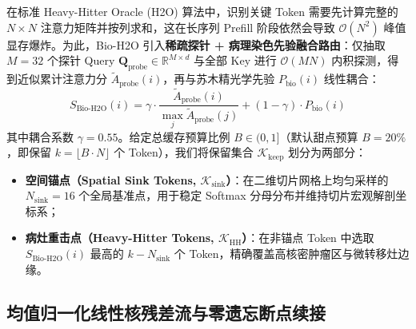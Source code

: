 \documentclass[10pt,twocolumn,a4paper]{ctexart}
\begin{document}
在标准 Heavy-Hitter Oracle (H2O) 算法中，识别关键 Token 需要先计算完整的 $N \times N$ 注意力矩阵并按列求和，这在长序列 Prefill 阶段依然会导致 $\mathcal{O}(N^2)$ 峰值显存爆炸。为此，Bio-H2O 引入\textbf{稀疏探针 + 病理染色先验融合路由}：仅抽取 $M=32$ 个探针 Query $\mathbf{Q}_{\text{probe}} \in \mathbb{R}^{M \times d}$ 与全部 Key 进行 $\mathcal{O}(M N)$ 内积探测，得到近似累计注意力分 $\tilde{A}_{\text{probe}}(i)$，再与苏木精光学先验 $P_{\text{bio}}(i)$ 线性耦合：
\begin{equation}
    S_{\text{Bio-H2O}}(i) = \gamma \cdot \frac{\tilde{A}_{\text{probe}}(i)}{\max_j \tilde{A}_{\text{probe}}(j)} + (1 - \gamma) \cdot P_{\text{bio}}(i)
\end{equation}
其中耦合系数 $\gamma = 0.55$。给定总缓存预算比例 $B \in (0, 1]$（默认甜点预算 $B = 20\%$，即保留 $k = \lfloor B \cdot N \rfloor$ 个 Token），我们将保留集合 $\mathcal{K}_{\text{keep}}$ 划分为两部分：
\begin{itemize}
    \item \textbf{空间锚点（Spatial Sink Tokens, $\mathcal{K}_{\text{sink}}$）}：在二维切片网格上均匀采样的 $N_{\text{sink}} = 16$ 个全局基准点，用于稳定 Softmax 分母分布并维持切片宏观解剖坐标系；
    \item \textbf{病灶重击点（Heavy-Hitter Tokens, $\mathcal{K}_{\text{HH}}$）}：在非锚点 Token 中选取 $S_{\text{Bio-H2O}}(i)$ 最高的 $k - N_{\text{sink}}$ 个 Token，精确覆盖高核密肿瘤区与微转移灶边缘。
\end{itemize}

\subsection{均值归一化线性核残差流与零遗忘断点续接}
\end{document}
